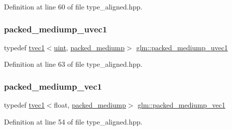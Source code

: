 Definition at line 60 of file type\+\_\+aligned.\+hpp.

\mbox{\label{group__gtc__type__aligned_gabde8aa40669369c3caeb44a88f323c94}} 
\subsubsection{\texorpdfstring{packed\_mediump\_uvec1}{packed\_mediump\_uvec1}}
{\footnotesize\ttfamily typedef \mbox{\hyperlink{structglm_1_1tvec1}{tvec1}}$<$\mbox{\hyperlink{group__core__precision_ga4fd29415871152bfb5abd588334147c8}{uint}}, \mbox{\hyperlink{namespaceglm_a0f04f086094c747d227af4425893f545a9604654c3b137cd7898689fd34b25bc0}{packed\+\_\+mediump}}$>$ \mbox{\hyperlink{group__gtc__type__aligned_gabde8aa40669369c3caeb44a88f323c94}{glm\+::packed\+\_\+mediump\+\_\+uvec1}}}



Definition at line 63 of file type\+\_\+aligned.\+hpp.

\mbox{\label{group__gtc__type__aligned_ga8925347b8c400ad16e18e6e46110002a}} 
\subsubsection{\texorpdfstring{packed\_mediump\_vec1}{packed\_mediump\_vec1}}
{\footnotesize\ttfamily typedef \mbox{\hyperlink{structglm_1_1tvec1}{tvec1}}$<$float, \mbox{\hyperlink{namespaceglm_a0f04f086094c747d227af4425893f545a9604654c3b137cd7898689fd34b25bc0}{packed\+\_\+mediump}}$>$ \mbox{\hyperlink{group__gtc__type__aligned_ga8925347b8c400ad16e18e6e46110002a}{glm\+::packed\+\_\+mediump\+\_\+vec1}}}



Definition at line 54 of file type\+\_\+aligned.\+hpp.

